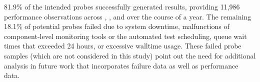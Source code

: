81.9\% of the intended probes successfully generated results, providing 
11,986 performance observations across \mira, \cori, and \edison over the
course of a year.
The remaining 18.1\% of potential probes failed due to system downtime,
malfunctions of component-level monitoring tools or the automated test
scheduling, queue wait times that exceeded 24 hours, or excessive walltime
usage.  These failed probe samples (which are not considered in this study) point out the need
for additional analysis in future work that incorporates failure data as
well as performance data.
